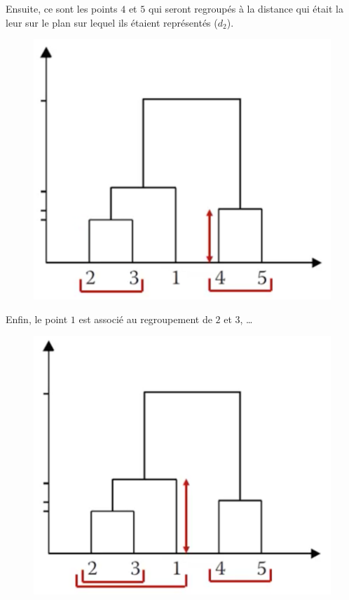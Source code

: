 Ensuite, ce sont les points $4$ et $5$ qui seront regroupés à la distance qui était la leur sur le plan sur lequel ils étaient représentés ($d_{2}$).
\begin{figure}[H]\begin{center}\includegraphics[scale=0.5]{ilu/ClassHierarArb45.png}\end{center}\end{figure}
Enfin, le point $1$ est associé au regroupement de $2$ et $3$, \dots
\begin{figure}[H]\begin{center}\includegraphics[scale=0.5]{ilu/ClassHierarArb123.png}\end{center}\end{figure}
